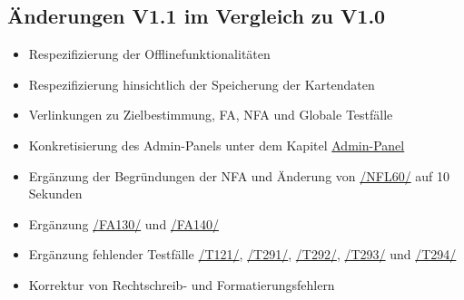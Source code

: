 \subsection*{Änderungen V1.1 im Vergleich zu V1.0}

\begin{itemize}
    \item Respezifizierung der Offlinefunktionalitäten
    \item Respezifizierung hinsichtlich der Speicherung der Kartendaten
    \item Verlinkungen zu Zielbestimmung, FA, NFA und Globale Testfälle 
    \item Konkretisierung des \Gls{Admin-Panel}s unter dem Kapitel \hyperref[Admin-Panel]{Admin-Panel}
    \item Ergänzung der Begründungen der NFA und Änderung von \hyperref[/NFL60/]{/NFL60/} auf 10 Sekunden
    \item Ergänzung \hyperref[/FA130/]{/FA130/} und \hyperref[/FA140/]{/FA140/}
    \item Ergänzung fehlender Testfälle \hyperref[/T121/]{/T121/}, \hyperref[/T291/]{/T291/}, \hyperref[/T292/]{/T292/}, \hyperref[/T293/]{/T293/} und \hyperref[/T294/]{/T294/}
    \item Korrektur von Rechtschreib- und Formatierungsfehlern
\end{itemize}